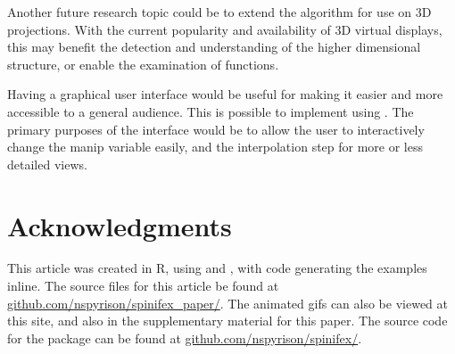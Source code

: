 Another future research topic could be to extend the algorithm for use
on 3D projections. With the current popularity and availability of 3D
virtual displays, this may benefit the detection and understanding of
the higher dimensional structure, or enable the examination of
functions.

Having a graphical user interface would be useful for making it easier
and more accessible to a general audience. This is possible to implement
using  \citep{chang_shiny_2020}. The primary purposes of
the interface would be to allow the user to interactively change the
manip variable easily, and the interpolation step for more or less
detailed views.

\hypertarget{acknowledgments}{%
\section{Acknowledgments}\label{acknowledgments}}

This article was created in R, using 
\citep{xie_knitr_2020} and 
\citep{allaire_rmarkdown_2020}, with code generating the examples
inline. The source files for this article be found at
\href{https://github.com/nspyrison/spinifex_paper/}{github.com/nspyrison/spinifex\_paper/}.
The animated gifs can also be viewed at this site, and also in the
supplementary material for this paper. The source code for the
 package can be found at
\href{https://github.com/nspyrison/spinifex/}{github.com/nspyrison/spinifex/}.



\address{%
Nicholas Spyrison\\
Monash University\\%
Faculty of Information Technology\\
%
%
%
\\\href{mailto:nicholas.spyrison@monash.edu}{\nolinkurl{nicholas.spyrison@monash.edu}}
}

\address{%
Dianne Cook\\
Monash University\\%
Department of Econometrics and Business Statistics\\
%
%
%
\\\href{mailto:dicook@monash.edu}{\nolinkurl{dicook@monash.edu}}
}

